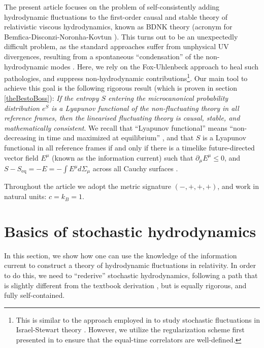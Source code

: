 \documentclass[a4paper, amsfonts, amssymb, amsmath, reprint, showkeys, nofootinbib, twoside,notitlepage,onecolumn]{revtex4-2}
\theoremstyle{definition}
\begin{document}
The present article focuses on the problem of self-consistently adding hydrodynamic fluctuations to the first-order causal and stable theory of relativistic viscous hydrodynamics, known as  BDNK theory (acronym for Bemfica-Disconzi-Noronha-Kovtun \cite{Bemfica2017TheFirst,Bemfica2019_conformal1,Kovtun2019,BemficaDNDefinitivo2020}). This turns out to be an unexpectedly difficult problem, as the standard approaches \cite{Abbasi:2022rum,Mullins:2023ott} suffer from unphysical UV divergences, resulting from a spontaneous ``condensation'' of the non-hydrodynamic modes \cite{GavassinoLyapunov_2020}. Here, we rely on the Fox-Uhlenbeck approach \cite{FoxUhlFluctuations1970} to heal such pathologies, and suppress non-hydrodynamic contributions\footnote{This is similar to the approach employed in \cite{Mullins:2023tjg, Mullins:2023ott} to study stochastic fluctuations in Israel-Stewart theory \cite{Israel_Stewart_1979}. However, we utilize the regularization scheme first presented in \cite{Gavassino:2024ufs} to ensure that the equal-time correlators are well-defined.}. Our main tool to achieve this goal is the following rigorous result (which is proven in section \ref{theBestoBoss}): \textit{If the entropy $S$ entering the microcanonical probability distribution $e^S$ is a Lyapunov functional of the non-fluctuating theory in all reference frames, then the linearised fluctuating theory is causal, stable, and mathematically consistent}. We recall that ``Lyapunov functional'' means ``non-decreasing in time and maximized at equilibrium'' \cite{lasalle1961stability}, and that $S$ is a Lyapunov functional in all reference frames if and only if there is a timelike future-directed vector field $E^\mu$ (known as the information current) such that $\partial_\mu E^\mu \leq 0$, and $S-S_{\text{eq}}=-E={-}\int E^\mu d\Sigma_\mu$ across all Cauchy surfaces \cite{GavassinoGibbs2021,GavassinoCausality2021,GavassinoGENERIC2022,GavassinoStabilityCarter2022}.

Throughout the article we adopt the metric signature $(-,+,+,+)$, and work in natural units: $c=k_B=1$.


\section{Basics of stochastic hydrodynamics}


In this section, we show how one can use the knowledge of the information current to construct a theory of hydrodynamic fluctuations in relativity. In order to do this, we need to ``rederive'' stochastic hydrodynamics, following a path that is slightly different from the textbook derivation \cite{landau5,landau9}, but is equally rigorous, and fully self-contained. 
\end{document}
